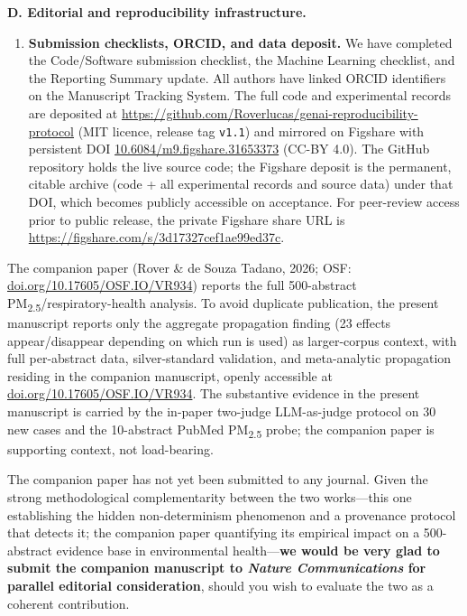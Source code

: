 \documentclass[11pt,a4paper]{article}
\begin{document}
\medskip
\noindent\textbf{D. Editorial and reproducibility infrastructure.}
\begin{enumerate}[leftmargin=*,resume]
  \item \textbf{Submission checklists, ORCID, and data deposit.} We have completed the Code/Software submission checklist, the Machine Learning checklist, and the Reporting Summary update. All authors have linked ORCID identifiers on the Manuscript Tracking System. The full code and experimental records are deposited at \url{https://github.com/Roverlucas/genai-reproducibility-protocol} (MIT licence, release tag \texttt{v1.1}) and mirrored on Figshare with persistent DOI \href{https://doi.org/10.6084/m9.figshare.31653373}{10.6084/m9.figshare.31653373} (CC-BY 4.0). The GitHub repository holds the live source code; the Figshare deposit is the permanent, citable archive (code + all experimental records and source data) under that DOI, which becomes publicly accessible on acceptance. For peer-review access prior to public release, the private Figshare share URL is \href{https://figshare.com/s/3d17327cef1ae99ed37c}{https://figshare.com/s/3d17327cef1ae99ed37c}.
\end{enumerate}

The companion paper (Rover \& de Souza Tadano, 2026; OSF: \href{https://doi.org/10.17605/OSF.IO/VR934}{doi.org/10.17605/OSF.IO/VR934}) reports the full 500-abstract PM\textsubscript{2.5}/respiratory-health analysis. To avoid duplicate publication, the present manuscript reports only the aggregate propagation finding (23 effects appear/disappear depending on which run is used) as larger-corpus context, with full per-abstract data, silver-standard validation, and meta-analytic propagation residing in the companion manuscript, openly accessible at \href{https://doi.org/10.17605/OSF.IO/VR934}{doi.org/10.17605/OSF.IO/VR934}. The substantive evidence in the present manuscript is carried by the in-paper two-judge LLM-as-judge protocol on 30 new cases and the 10-abstract PubMed PM\textsubscript{2.5} probe; the companion paper is supporting context, not load-bearing.

The companion paper has not yet been submitted to any journal. Given the strong methodological complementarity between the two works---this one establishing the hidden non-determinism phenomenon and a provenance protocol that detects it; the companion paper quantifying its empirical impact on a 500-abstract evidence base in environmental health---\textbf{we would be very glad to submit the companion manuscript to \emph{Nature Communications} for parallel editorial consideration}, should you wish to evaluate the two as a coherent contribution.
\end{document}
